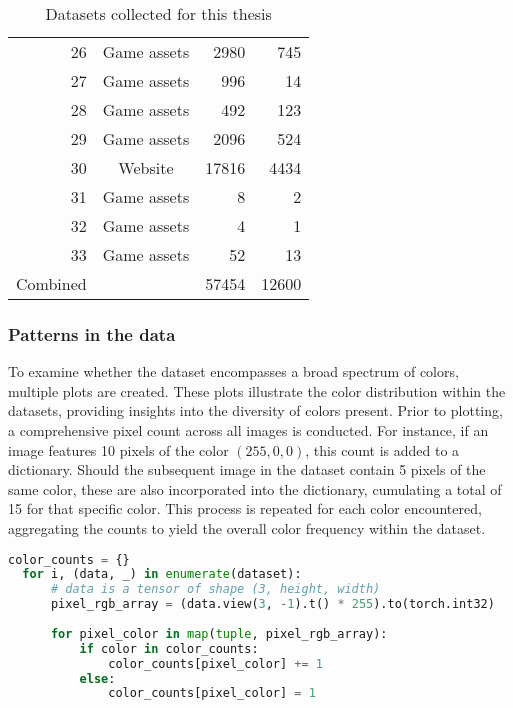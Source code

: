 \begin{table}[H]
\begin{adjustbox}{width=0.8\textwidth}
\begin{tabular}{|r|c|r|r|}
              26 & Game assets & 2980 & 745 \\
              27 & Game assets & 996 & 14 \\
              28 & Game assets & 492 & 123 \\
              29 & Game assets & 2096 & 524 \\
              30 & Website & 17816 & 4434 \\
              31 & Game assets & 8 & 2 \\
              32 & Game assets & 4 & 1 \\
              33 & Game assets & 52 & 13 \\
              \hline
              Combined & & 57454 & 12600 \\
              \hline
          \end{tabular}
        \end{adjustbox}
        \caption{Datasets collected for this thesis}
        \label{tab:datasets}
    \end{table}

    \subsubsection{Patterns in the data}
    
    To examine whether the dataset encompasses a broad spectrum of colors, multiple plots are created. These plots illustrate the color distribution within the datasets, providing insights into the diversity of colors present. Prior to plotting, a comprehensive pixel count across all images is conducted. For instance, if an image features 10 pixels of the color $(255, 0, 0)$, this count is added to a dictionary. Should the subsequent image in the dataset contain 5 pixels of the same color, these are also incorporated into the dictionary, cumulating a total of 15 for that specific color. This process is repeated for each color encountered, aggregating the counts to yield the overall color frequency within the dataset.

\begin{lstlisting}[language=Python]
  color_counts = {} 
  for i, (data, _) in enumerate(dataset):
      # data is a tensor of shape (3, height, width) 
      pixel_rgb_array = (data.view(3, -1).t() * 255).to(torch.int32)
      
      for pixel_color in map(tuple, pixel_rgb_array):
          if color in color_counts:
              color_counts[pixel_color] += 1
          else:
              color_counts[pixel_color] = 1
\end{lstlisting}

